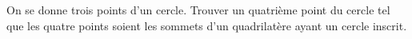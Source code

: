 On se donne trois points d'un cercle. Trouver un quatrième point du cercle tel que les quatre points soient les sommets d'un quadrilatère ayant un cercle inscrit.
